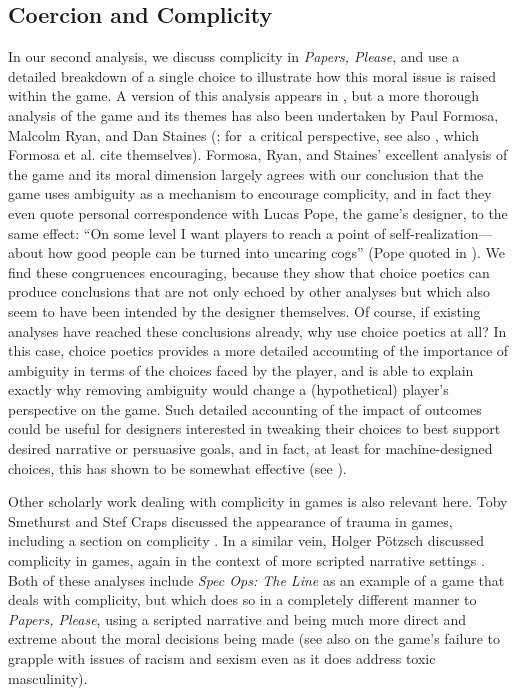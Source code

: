 \documentclass[arts,article,accept,moreauthors,pdftex,10pt,a4paper]{Definitions/mdpi}
\begin{document}
\subsection{Coercion and Complicity}

In our second analysis, we  discuss complicity in \emph{Papers, Please}, and use a detailed breakdown of a single choice to illustrate how this moral issue is raised within the game.
%
A version of this analysis appears in \citep{mawhorter2016artificial}, but a more thorough analysis of the game and its themes has also been undertaken by 
Paul Formosa, Malcolm Ryan, and Dan Staines (\cite{formosa2016papers}; for~a critical perspective, see also \cite{alexander2013designing}, which Formosa et al. cite themselves).
%
Formosa, Ryan, and Staines' excellent analysis of the game and its moral dimension largely agrees with our conclusion that the game uses ambiguity as a mechanism to encourage complicity, and in fact they even quote personal correspondence with Lucas Pope, the game's designer, to the same effect: ``On some level I want players to reach a point of self-realization---about how good people can be turned into uncaring cogs'' (Pope quoted in \cite{formosa2016papers}).
%
We find these congruences encouraging, because they show that choice poetics can produce conclusions that are not only echoed by other analyses but which also seem to have been intended by the designer themselves.
%
Of course, if existing analyses have reached these conclusions already, why use choice poetics at all?
%
In this case, choice poetics provides a more detailed accounting of the importance of ambiguity in terms of the choices faced by the player, and is able to explain exactly why removing ambiguity would change a (hypothetical) player's perspective on the game.
%
Such detailed accounting of the impact of outcomes could be useful for designers interested in tweaking their choices to best support desired narrative or persuasive goals, and in fact, at least for machine-designed choices, this has shown to be somewhat effective (see \cite{mawhorter2015intentionally}).


Other scholarly work dealing with complicity in games is also relevant here.
%
Toby Smethurst and Stef Craps  discussed the appearance of trauma in games, including a section on complicity \citep{smethurst2015playing}.
%
In a similar vein, Holger Pötzsch  discussed complicity in games, again in the context of more scripted narrative settings \citep{potzsch2017selective}.
%
Both of these analyses include \emph{Spec Ops: The Line} \citep{yager2012spec} as an example of a game that deals with complicity, but which does so in a completely different manner to \emph{Papers, Please}, using a scripted narrative and being much more direct and extreme about the moral decisions being made (see also \cite{murray2016race} on the game's failure to grapple with issues of racism and sexism even as it does address toxic masculinity).
\end{document}
